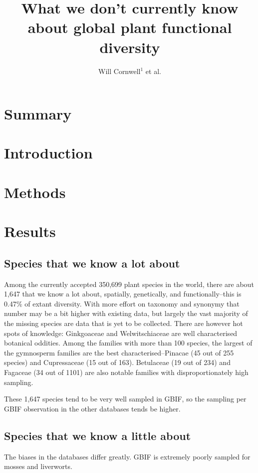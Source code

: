 \documentclass[a4paper,11pt]{article}
\title{What we don't currently know about global plant functional diversity}
\author{
Will Cornwell$^1$
et al.}
\affiliation{
*final list and order undecided\\
$^1$ University of NSW\\
}
\date{}
\begin{document}
\mstitlepage
\noindent

\section{Summary}


\section{Introduction}

\section{Methods}

\section{Results}

\subsection{Species that we know a lot about}

Among the currently accepted 350,699 plant species in the world, there are about 1,647 that we know a lot about, spatially, genetically, and functionally--this is 0.47\% of extant diversity.  With more effort on taxonomy and synonymy that number may be a bit higher with existing data, but largely the vast majority of the missing species are  data that is yet to be collected.  There are however hot spots of knowledge: Ginkgoaceae and Welwitschiaceae are well characterised botanical oddities.  Among the families with more than 100 species, the largest of the gymnosperm families are the best characterised--Pinacae (45 out of 255 species) and Cupressaceae (15 out of 163). Betulaceae (19 out of 234) and Fagaceae (34 out of 1101) are also notable families with disproportionately high sampling.  

These 1,647 species tend to be very well sampled in GBIF, so the sampling per GBIF observation in the other databases tends be higher.

\subsection{Species that we know a little about}

The biases in the databases differ greatly.  GBIF is extremely poorly sampled for mosses and liverworts.  
\end{document}
